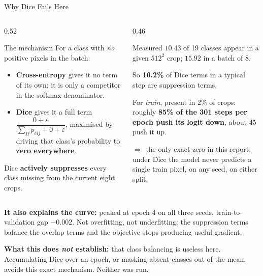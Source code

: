 \begin{frame}{Why Dice Fails Here}
\small
\begin{columns}[T]
\begin{column}{0.52\textwidth}
\begin{block}{The mechanism}
For a class with \emph{no} positive pixels in the batch:
\begin{itemize}
    \item \textbf{Cross-entropy} gives it no term of its own; it is only a competitor in the
          softmax denominator.
    \item \textbf{Dice} gives it a full term
          $\dfrac{0 + \varepsilon}{\sum_\Omega p_{cij} + 0 + \varepsilon}$,
          maximised by driving that class's probability to \textbf{zero everywhere}.
\end{itemize}
Dice \textbf{actively suppresses} every class missing from the current eight crops.
\end{block}
\end{column}
\begin{column}{0.46\textwidth}
\begin{block}{Measured}
\footnotesize
$10.43$ of 19 classes appear in a given $512^2$ crop; $15.92$ in a batch of 8.

So \textbf{16.2\%} of Dice terms in a typical step are suppression terms.

For \emph{train}, present in 2\% of crops: roughly \textbf{85\% of the 301 steps per epoch push
its logit down}, about 45 push it up.

$\Rightarrow$ the only exact zero in this report: under Dice the model never predicts a single
train pixel, on any seed, on either split.
\end{block}
\end{column}
\end{columns}

\vspace{-0.1cm}
\footnotesize
\textbf{It also explains the curve:} peaked at epoch 4 on all three seeds, train-to-validation gap
$-0.002$. Not overfitting, not underfitting: the suppression terms balance the overlap terms and
the objective stops producing useful gradient.

\textbf{What this does \emph{not} establish:} that class balancing is useless here. Accumulating
Dice over an epoch, or masking absent classes out of the mean, avoids this exact mechanism. Neither
was run.
\end{frame}
